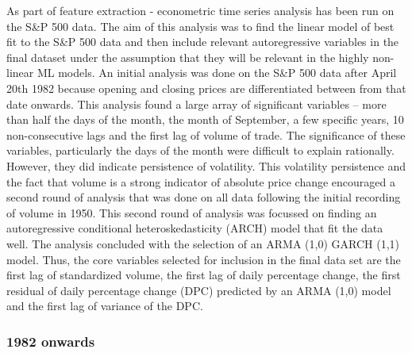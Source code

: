 \documentclass[11pt,preprint, authoryear]{elsarticle}
\numberwithin{equation}{section}
\numberwithin{figure}{section}
\numberwithin{table}{section}
\begin{document}
As part of feature extraction - econometric time series analysis has
been run on the S\&P 500 data. The aim of this analysis was to find the
linear model of best fit to the S\&P 500 data and then include relevant
autoregressive variables in the final dataset under the assumption that
they will be relevant in the highly non-linear ML models. An initial
analysis was done on the S\&P 500 data after April 20th 1982 because
opening and closing prices are differentiated between from that date
onwards. This analysis found a large array of significant variables --
more than half the days of the month, the month of September, a few
specific years, 10 non-consecutive lags and the first lag of volume of
trade. The significance of these variables, particularly the days of the
month were difficult to explain rationally. However, they did indicate
persistence of volatility. This volatility persistence and the fact that
volume is a strong indicator of absolute price change encouraged a
second round of analysis that was done on all data following the initial
recording of volume in 1950. This second round of analysis was focussed
on finding an autoregressive conditional heteroskedasticity (ARCH) model
that fit the data well. The analysis concluded with the selection of an
ARMA (1,0) GARCH (1,1) model. Thus, the core variables selected for
inclusion in the final data set are the first lag of standardized
volume, the first lag of daily percentage change, the first residual of
daily percentage change (DPC) predicted by an ARMA (1,0) model and the
first lag of variance of the DPC.

\hypertarget{onwards}{%
\subsubsection{1982 onwards}\label{onwards}}
\end{document}
